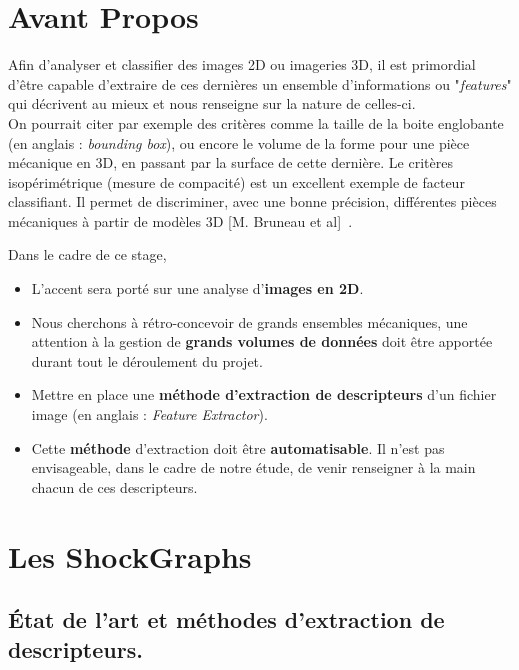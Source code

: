 \section*{Avant Propos}

Afin d'analyser et classifier des images 2D ou imageries 3D, il est primordial d'être capable d'extraire de ces dernières un ensemble d'informations ou "\textit{features}" qui décrivent au mieux et nous renseigne sur la nature de celles-ci.\\
On pourrait citer par exemple des critères comme la taille de la boite englobante (en anglais : \textit{bounding box}), ou encore le volume de la forme pour une pièce mécanique en 3D, en passant par la surface de cette dernière. Le critères isopérimétrique (mesure de compacité) est un excellent exemple de facteur classifiant. Il permet de discriminer, avec une bonne précision, différentes pièces mécaniques à partir de modèles 3D [M. Bruneau et al]~\cite{Bruneau2014}.

Dans le cadre de ce stage,\\
\begin{itemize}
	\item	L'accent sera porté sur une analyse d'\textbf{images en 2D}.\\
	\item	Nous cherchons à rétro-concevoir de grands ensembles mécaniques, une attention à la gestion de \textbf{grands volumes de données} doit être apportée durant tout le déroulement du projet.\\
	\item	Mettre en place une \textbf{méthode d'extraction de descripteurs} d'un fichier image (en anglais : \textit{Feature Extractor}).\\
	\item	Cette \textbf{méthode} d'extraction doit être \textbf{automatisable}. Il n'est pas envisageable, dans le cadre de notre étude, de venir renseigner à la main chacun de ces descripteurs.	
\end{itemize}
\vspace{3mm}
  

\section{Les ShockGraphs}

\subsection{État de l'art et méthodes d'extraction de descripteurs.}

